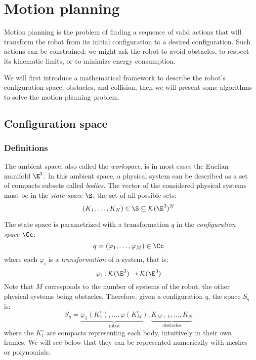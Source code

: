 \section{Motion planning}
Motion planning is the problem of finding a sequence of valid actions that will transform the robot from its initial configuration to a desired configuration. Such actions can be constrained: we might ask the robot to avoid obstacles, to respect its kinematic limits, or to minimize energy consumption. 

We will first introduce a mathematical framework to describe the robot's configuration space, obstacles, and collision, then we will present some algorithms to solve the motion planning problem.

\subsection{Configuration space}
\subsubsection{Definitions}
The ambient space, also called the \emph{workspace}, is in most cases the Euclian manifold $\E^3$. In this ambient space, a physical system can be described as a set of compacts subsets called \emph{bodies}. The vector of the considered physical systems must be in the \emph{state space} $\S$, the set of all possible sets:
\begin{equation*}
    (K_1, \dots, K_N) \in\S \subseteq \mathcal{K}(\E^3)^N
\end{equation*}

The state space is parametrized with a transformation $q$ in the \emph{configuration space} $\Cc$:
\begin{equation*}
    q = (\varphi_1, \dots, \varphi_M)\in\Cc
\end{equation*}
where each $\varphi_i$ is a \emph{transformation} of a system, that is:
\begin{equation*}
    \varphi_i: \mathcal{K}(\E^3) \to \mathcal{K}(\E^3)
\end{equation*}
Note that $M$ corresponds to the number of systems of the robot, the other physical systems being obstacles. Therefore, given a configuration $q$, the space $S_q$ is:
\begin{equation*}
    S_q = \underbrace{\varphi_1(K_1^\circ), \dots, \varphi(K_M^\circ)}_{\text{robot}}, \underbrace{K_{M+1}, \dots, K_N}_{\text{obstacles}}
\end{equation*}
where the $K_i^\circ$ are compacts representing each body, intuitively in their own frames. We will see below that they can be represented numerically with meshes or polynomials.

